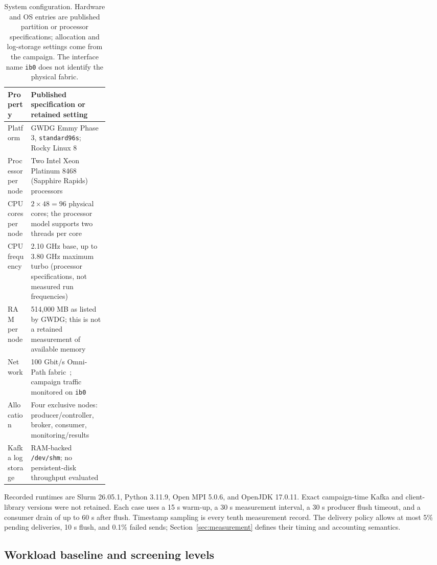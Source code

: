\documentclass[10pt]{article}
\begin{document}
\begin{table}[!htbp]
\centering
\footnotesize
\begin{tabularx}{\linewidth}{@{}L{0.23\linewidth}Y@{}}
\toprule
Property & Published specification or retained setting \\
\midrule
Platform & GWDG Emmy Phase 3, \texttt{standard96s}; Rocky Linux 8~\cite{gwdgcpupartitions} \\
Processor per node & Two Intel Xeon Platinum 8468 (Sapphire Rapids) processors~\cite{gwdgcpupartitions} \\
CPU cores per node & $2\times48=96$ physical cores; the processor model supports two threads per core~\cite{gwdgcpupartitions,intel8468} \\
CPU frequency & 2.10 GHz base, up to 3.80 GHz maximum turbo (processor specifications, not measured run frequencies)~\cite{intel8468} \\
RAM per node & 514,000 MB as listed by GWDG; this is not a retained measurement of available memory~\cite{gwdgcpupartitions} \\
Network & 100 Gbit/s Omni-Path fabric~\cite{gwdgcpupartitions}; campaign traffic monitored on \texttt{ib0} \\
Allocation & Four exclusive nodes: producer/controller, broker, consumer, monitoring/results \\
Kafka log storage & RAM-backed \texttt{/dev/shm}; no persistent-disk throughput evaluated \\
\bottomrule
\end{tabularx}
\caption{System configuration. Hardware and OS entries are published partition
or processor specifications; allocation and log-storage settings come from the
campaign. The interface name \texttt{ib0} does not identify the physical fabric.}
\label{tab:system-hardware}
\end{table}

Recorded runtimes are Slurm 26.05.1, Python 3.11.9, Open MPI 5.0.6, and
OpenJDK 17.0.11. Exact campaign-time Kafka and client-library versions were not
retained. Each case uses a 15 s warm-up, a 30 s measurement interval, a 30 s
producer flush timeout, and a consumer drain of up to 60 s after flush.
Timestamp sampling is every tenth measurement record. The delivery policy
allows at most 5\% pending deliveries, 10 s flush, and 0.1\% failed sends;
Section~\ref{sec:measurement} defines their timing and accounting semantics.

\subsection{Workload baseline and screening levels}
\end{document}
